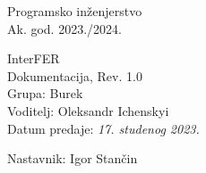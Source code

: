 \documentclass[12pt]{report}
\begin{document}
\begin{titlepage}
	\begin{center}
		\LARGE Programsko inženjerstvo\\
		\large Ak. god. 2023./2024.\\


		\huge InterFER\\
		\Large Dokumentacija, Rev. 1.0\\

		\normalsize
		Grupa: Burek\\
		Voditelj: Oleksandr Ichenskyi\\


		Datum predaje: \textit{17. studenog 2023.}\\


		Nastavnik: Igor Stančin\\

	\end{center}


\end{titlepage}


\tableofcontents






% 
% 



\begingroup
\renewcommand*\listfigurename{Indeks slika i dijagrama}
\listoffigures
\endgroup
{}



\eject


\end{document}
